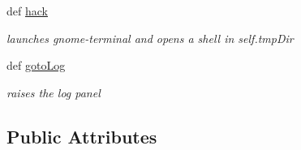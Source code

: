 \begin{DoxyCompactItemize}
def \hyperlink{classuicilibris_1_1w2mMainWindow_a55d3ee40c7ee582b4ce7af1ce91c92d7}{hack}
\begin{DoxyCompactList}\small\item\em launches gnome-\/terminal and opens a shell in self.\-tmp\-Dir \end{DoxyCompactList}\item 
def \hyperlink{classuicilibris_1_1w2mMainWindow_a7895d4ac97825f2105c4508a4b5e82f9}{goto\-Log}
\begin{DoxyCompactList}\small\item\em raises the log panel \end{DoxyCompactList}\end{DoxyCompactItemize}
\subsection*{\-Public \-Attributes}
